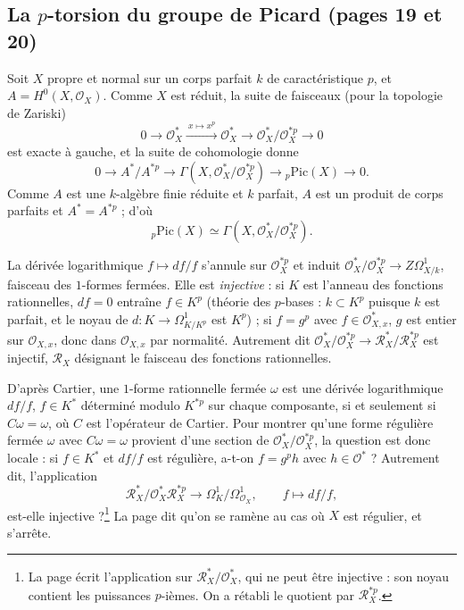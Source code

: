 \documentclass[11pt,a4paper]{article}
\begin{document}
\subsection*{La $p$-torsion du groupe de Picard (pages 19 et 20)}

Soit $X$ propre et normal sur un corps parfait $k$ de caractéristique $p$, et
$A = H^0(X, \mathcal{O}_X)$. Comme $X$ est réduit, la suite de faisceaux
(pour la topologie de Zariski)
\[
0 \to \mathcal{O}_X^{*} \xrightarrow{\ x \mapsto x^{p}\ } \mathcal{O}_X^{*}
\to \mathcal{O}_X^{*}/\mathcal{O}_X^{*p} \to 0
\]
est exacte à gauche, et la suite de cohomologie donne
\[
0 \to A^{*}/A^{*p} \to \Gamma(X, \mathcal{O}_X^{*}/\mathcal{O}_X^{*p}) \to
{}_p\mathrm{Pic}(X) \to 0 .
\]
Comme $A$ est une $k$-algèbre finie réduite et $k$ parfait, $A$ est un produit
de corps parfaits et $A^{*} = A^{*p}$ ; d'où
\[
{}_p\mathrm{Pic}(X) \simeq \Gamma(X, \mathcal{O}_X^{*}/\mathcal{O}_X^{*p}).
\]

La dérivée logarithmique $f \mapsto df/f$ s'annule sur $\mathcal{O}_X^{*p}$ et
induit $\mathcal{O}_X^{*}/\mathcal{O}_X^{*p} \to Z\Omega^1_{X/k}$, faisceau des
$1$-formes fermées. Elle est \emph{injective} : si $K$ est l'anneau des
fonctions rationnelles, $df = 0$ entraîne $f \in K^{p}$ (théorie des
$p$-bases : $k \subset K^{p}$ puisque $k$ est parfait, et le noyau de $d : K \to
\Omega^1_{K/K^{p}}$ est $K^{p}$) ; si $f = g^{p}$ avec $f \in
\mathcal{O}_{X,x}^{*}$, $g$ est entier sur $\mathcal{O}_{X,x}$, donc dans
$\mathcal{O}_{X,x}$ par normalité. Autrement dit
$\mathcal{O}_X^{*}/\mathcal{O}_X^{*p} \to \mathcal{R}_X^{*}/\mathcal{R}_X^{*p}$
est injectif, $\mathcal{R}_X$ désignant le faisceau des fonctions rationnelles.

D'après Cartier, une $1$-forme rationnelle fermée $\omega$ est une dérivée
logarithmique $df/f$, $f \in K^{*}$ déterminé modulo $K^{*p}$ sur chaque
composante, si et seulement si $C\omega = \omega$, où $C$ est l'opérateur de
Cartier. Pour montrer qu'une forme régulière fermée $\omega$ avec $C\omega =
\omega$ provient d'une section de $\mathcal{O}_X^{*}/\mathcal{O}_X^{*p}$, la
question est donc locale : si $f \in K^{*}$ et $df/f$ est régulière, a-t-on
$f = g^{p}h$ avec $h \in \mathcal{O}^{*}$ ? Autrement dit, l'application
\[
\mathcal{R}_X^{*}/\mathcal{O}_X^{*}\mathcal{R}_X^{*p} \longrightarrow
\Omega^1_{K}/\Omega^1_{\mathcal{O}_X}, \qquad f \mapsto df/f,
\]
est-elle injective ?\footnote{La page écrit l'application sur
$\mathcal{R}_X^{*}/\mathcal{O}_X^{*}$, qui ne peut être injective : son noyau
contient les puissances $p$-ièmes. On a rétabli le quotient par
$\mathcal{R}_X^{*p}$.} La page dit qu'on se ramène au cas où $X$ est
régulier, et s'arrête.
\end{document}
